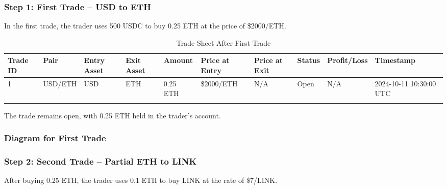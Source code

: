 \documentclass{article}
\begin{document}
\subsubsection{Step 1: First Trade – USD to ETH}

In the first trade, the trader uses 500 USDC to buy 0.25 ETH at the price of \$2000/ETH.

\begin{center}
  \scriptsize %
  \begin{longtable}{|p{0.8cm}|p{1.2cm}|p{1.5cm}|p{1.5cm}|p{1cm}|p{1.5cm}|p{1.5cm}|p{1cm}|p{1.5cm}|p{1.5cm}|}
    \hline
  \textbf{Trade ID} & \textbf{Pair} & \textbf{Entry Asset} & \textbf{Exit Asset} & \textbf{Amount} & \textbf{Price at Entry} & \textbf{Price at Exit} & \textbf{Status} & \textbf{Profit/Loss} & \textbf{Timestamp} \\
  \hline
  1 & USD/ETH & USD & ETH & 0.25 ETH & \$2000/ETH & N/A & Open & N/A & 2024-10-11 10:30:00 UTC \\
  \hline
  \caption{Trade Sheet After First Trade}
  \end{longtable}
  \end{center}
  
The trade remains open, with 0.25 ETH held in the trader's account.

\subsubsection*{Diagram for First Trade}


\newpage

\subsubsection{Step 2: Second Trade – Partial ETH to LINK}

After buying 0.25 ETH, the trader uses 0.1 ETH to buy LINK at the rate of \$7/LINK.
\end{document}
